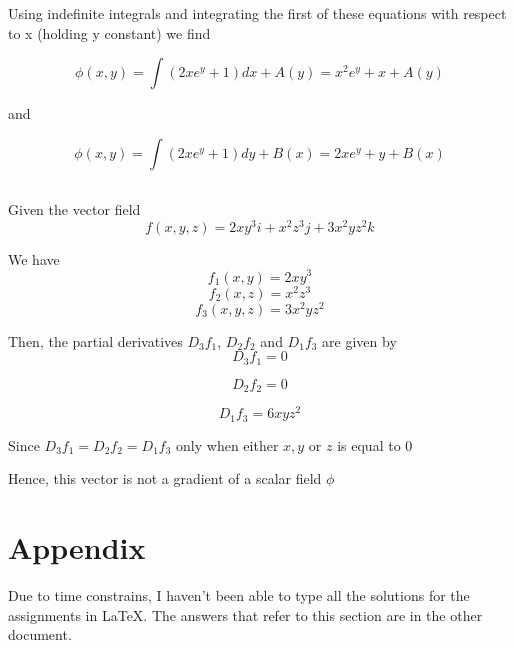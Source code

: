 \documentclass[11pt]{article}
\begin{document}
Using indefinite integrals and integrating the first of these equations with respect to x (holding y constant) we find

$$\phi(x,y) = \int(2xe^{y} + 1)dx + A(y) = x^{2}e^{y} + x + A(y)$$

and

$$\phi(x,y) = \int(2xe^{y} + 1)dy + B(x) = 2xe^{y} + y + B(x)$$

\subsection{}

Given the vector field $$f(x,y,z) = 2xy^{3}i + x^{2}z^{3}j + 3x^{2}yz^{2}k$$

We have $$f_{1}(x,y) = 2xy^{3}$$ $$f_{2}(x,z) = x^{2}z^{3}$$ $$f_{3}(x,y,z) = 3x^{2}yz^{2}$$

Then, the partial derivatives $D_{3}f_{1}$, $D_{2}f_{2}$ and $D_{1}f_{3}$ are given by
$$D_{3}f_{1} = 0$$

$$D_{2}f_{2} = 0$$

$$D_{1}f_{3} = 6xyz^{2}$$

Since $D_{3}f_{1} = D_{2}f_{2} = D_{1}f_{3}$ only when either $x, y$ or $z$ is equal to $0$

Hence, this vector is not a gradient of a scalar field $\phi$

\newpage

\section{Appendix}

Due to time constrains, I haven't been able to type all the solutions for the assignments in LaTeX. The answers that refer to this section are in the other document.
\end{document}
